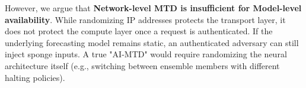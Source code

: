 However, we argue that \textbf{Network-level MTD is insufficient for Model-level availability}. While randomizing IP addresses protects the transport layer, it does not protect the compute layer once a request is authenticated. If the underlying forecasting model remains static, an authenticated adversary can still inject sponge inputs. A true "AI-MTD" would require randomizing the neural architecture itself (e.g., switching between ensemble members with different halting policies).
